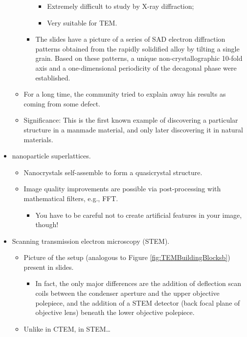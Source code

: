 \documentclass[../notes.tex]{subfiles}
\begin{document}
\begin{itemize}
\begin{itemize}
\begin{itemize}
\begin{itemize}
                \item Extremely difficult to study by X-ray diffraction;
                \item Very suitable for TEM.
            \end{itemize}
            \item The slides have a picture of a series of SAD electron diffraction patterns obtained from the  rapidly solidified alloy by tilting a single grain. Based on these patterns, a unique non-crystallographic 10-fold axis and a one-dimensional periodicity of the decagonal phase were established.
        \end{itemize}
        \item For a long time, the community tried to explain away his results as coming from some defect.
        \item Significance: This is the first known example of discovering a particular structure in a manmade material, and only later discovering it in natural materials.
    \end{itemize}
    \item {} nanoparticle superlattices.
    \begin{itemize}
        \item Nanocrystals self-assemble to form a quasicrystal structure.
        \item Image quality improvements are possible via post-processing with mathematical filters, e.g., FFT.
        \begin{itemize}
            \item You have to be careful not to create artificial features in your image, though!
        \end{itemize}
    \end{itemize}
    \item Scanning transmission electron microscopy (STEM).
    \begin{itemize}
        \item Picture of the setup (analogous to Figure \ref{fig:TEMBuildingBlocksb}) present in slides.
        \begin{itemize}
            \item In fact, the only major differences are the addition of deflection scan coils between the condenser aperture and the upper objective polepiece, and the addition of a STEM detector (back focal plane of objective lens) beneath the lower objective polepiece.
        \end{itemize}
        \item Unlike in CTEM, in STEM\dots

\end{itemize}
\end{itemize}
\end{document}
